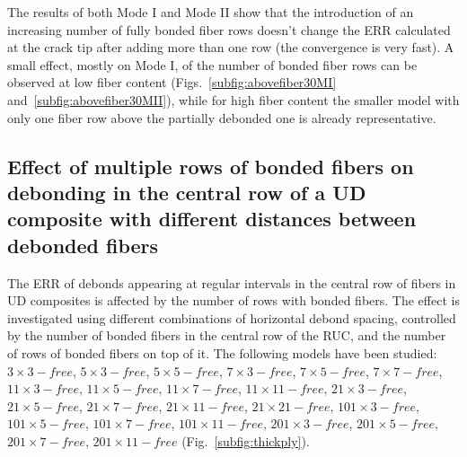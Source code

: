 \documentclass[review]{elsarticle}
\begin{document}
The results of both Mode I and Mode II show that the introduction of an increasing number of fully bonded fiber rows doesn't change the ERR calculated at the crack tip after adding more than one row (the convergence is very fast). A small effect, mostly on Mode I, of the number of bonded fiber rows can be observed at low fiber content (Figs.~\ref{subfig:abovefiber30MI} and~\ref{subfig:abovefiber30MII}), while for high fiber content the smaller model with only one fiber row above the partially debonded one is already representative.

\subsection{Effect of multiple rows of bonded fibers on debonding in the central row of a UD composite with different distances between debonded fibers}\label{subsec:multrow}

The ERR of debonds appearing at regular intervals in the central row of fibers in UD composites is affected by the number of rows with bonded fibers. The effect is investigated using different combinations of horizontal debond spacing, controlled by the number of bonded fibers in the central row of the RUC, and the number of rows of bonded fibers on top of it. The following models have been studied: $3\times 3-free$, $5\times 3-free$, $5\times 5-free$, $7\times 3-free$, $7\times 5-free$, $7\times 7-free$, $11\times 3-free$, $11\times 5-free$, $11\times 7-free$, $11\times 11-free$, $21\times 3-free$, $21\times 5-free$, $21\times 7-free$, $21\times 11-free$, $21\times 21-free$, $101\times 3-free$, $101\times 5-free$, $101\times 7-free$, $101\times 11-free$, $201\times 3-free$, $201\times 5-free$, $201\times 7-free$, $201\times 11-free$  (Fig.~\ref{subfig:thickply}).
\end{document}

